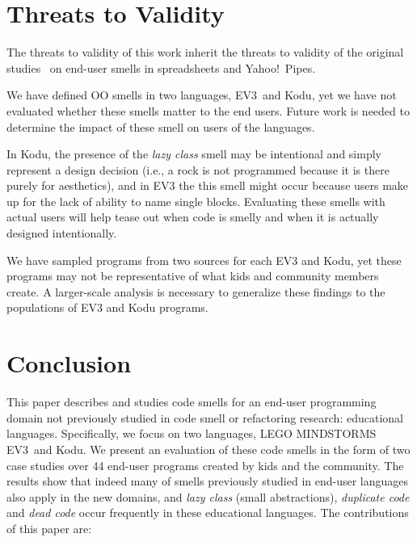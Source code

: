 \documentclass[conference]{IEEEtran}
\newcommand{\ms}{LEGO MINDSTORMS EV3}
\begin{document}
%
%
%



\section{Threats to Validity}
\label{sec:threats}
The threats to validity of this work inherit the threats to validity of the original studies~\cite{Stolee2015, Stolee2011, StoleeTSE2013, Hermans2011, Hermans2012intra, Hermans2012inter} on end-user smells in spreadsheets and Yahoo!\ Pipes.


We have defined OO smells in two languages, EV3~and Kodu, yet we have not evaluated whether these smells matter to the end users. Future work is needed to determine the impact of these smell on users of the languages. 

In Kodu, the presence of the \emph{lazy class} smell may be intentional and simply represent a design decision (i.e., a rock is not programmed because it is there purely for aesthetics), and in EV3 the this smell might occur because users make up for the lack of ability to name single blocks. Evaluating these smells with actual users will help tease out when code is smelly and when it is actually designed intentionally. 

We have sampled programs from two sources for each EV3 and Kodu, yet these programs may not be representative of what kids and community members create. A larger-scale analysis is necessary to generalize these findings to the populations of EV3 and Kodu programs. 

\section{Conclusion}
\label{sec:conclusions}
This paper describes and studies code smells for an end-user programming  domain not previously studied in code smell or refactoring research: educational languages. Specifically, we focus on two languages, \ms~and Kodu. We present an evaluation of these code smells in the form of two case studies over 44 end-user programs created by kids and the community. The results show that indeed many of smells previously studied in end-user languages also apply in the new domains, and \emph{lazy class} (small abstractions), \emph{duplicate code} and \emph{dead code} occur frequently in these educational languages. The contributions of this paper are:
\end{document}
